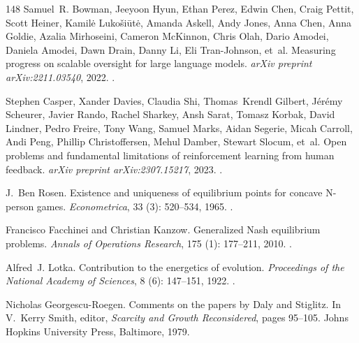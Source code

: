 \documentclass[11pt]{article}
\theoremstyle{plain}
\theoremstyle{definition}
\theoremstyle{remark}
\begin{document}
\begin{thebibliography}{148}
Samuel~R. Bowman, Jeeyoon Hyun, Ethan Perez, Edwin Chen, Craig Pettit, Scott
  Heiner, Kamil{\.e} Luko{\v{s}}i{\=u}t{\.e}, Amanda Askell, Andy Jones, Anna
  Chen, Anna Goldie, Azalia Mirhoseini, Cameron McKinnon, Chris Olah, Dario
  Amodei, Daniela Amodei, Dawn Drain, Danny Li, Eli Tran-Johnson, et~al.
\newblock Measuring progress on scalable oversight for large language models.
\newblock \emph{arXiv preprint arXiv:2211.03540}, 2022.
\newblock {}.

Stephen Casper, Xander Davies, Claudia Shi, Thomas~Krendl Gilbert,
  J{\'e}r{\'e}my Scheurer, Javier Rando, Rachel Sharkey, Ansh Sarat, Tomasz
  Korbak, David Lindner, Pedro Freire, Tony Wang, Samuel Marks, Aidan Segerie,
  Micah Carroll, Andi Peng, Phillip Christoffersen, Mehul Damber, Stewart
  Slocum, et~al.
\newblock Open problems and fundamental limitations of reinforcement learning
  from human feedback.
\newblock \emph{arXiv preprint arXiv:2307.15217}, 2023.
\newblock {}.

J.~Ben Rosen.
\newblock Existence and uniqueness of equilibrium points for concave {N}-person
  games.
\newblock \emph{Econometrica}, 33 (3): 520--534, 1965.
\newblock {}.

Francisco Facchinei and Christian Kanzow.
\newblock Generalized {Nash} equilibrium problems.
\newblock \emph{Annals of Operations Research}, 175 (1):
  177--211, 2010.
\newblock {}.

Alfred~J. Lotka.
\newblock Contribution to the energetics of evolution.
\newblock \emph{Proceedings of the National Academy of Sciences}, 8
  (6): 147--151, 1922.
\newblock {}.

Nicholas Georgescu-Roegen.
\newblock Comments on the papers by {Daly} and {Stiglitz}.
\newblock In V.~Kerry Smith, editor, \emph{Scarcity and Growth Reconsidered},
  pages 95--105. Johns Hopkins University Press, Baltimore, 1979.


\end{thebibliography}
\end{document}
